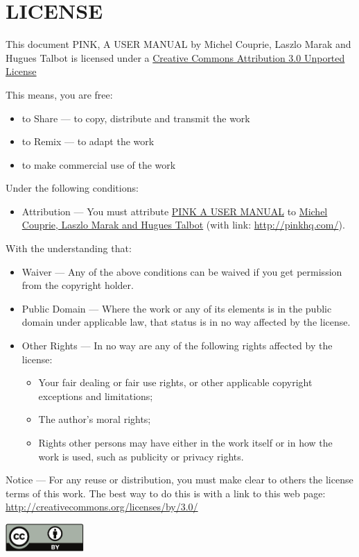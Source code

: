 \chapter*{LICENSE}

This document \og PINK, A USER MANUAL \fg by Michel Couprie, Laszlo Marak and Hugues Talbot is licensed under a \href{http://creativecommons.org/licenses/by/3.0/}{Creative Commons Attribution 3.0 Unported License}

This means, you are free:

\begin{itemize}
\item to Share — to copy, distribute and transmit the work
\item to Remix — to adapt the work
\item to make commercial use of the work
\end{itemize}

Under the following conditions:

\begin{itemize}
\item Attribution — You must attribute \href{http://creativecommons.org/choose/results-one?q_1=2&q_1=1&field_commercial=y&field_derivatives=y&field_jurisdiction=&field_format=Text&field_worktitle=PINK+A+USER+MANUAL&field_attribute_to_name=Hugues+Talbot&field_attribute_to_url=http%3A%2F%2Fpinkhq.com%2F&field_sourceurl=&field_morepermissionsurl=&lang=en_US&n_questions=3}{PINK A USER MANUAL} to \href{http://pinkhq.com}{Michel Couprie, Laszlo Marak and Hugues Talbot} (with link: \url{http://pinkhq.com/}).
\end{itemize}
  
With the understanding that:

\begin{itemize}
\item Waiver — Any of the above conditions can be waived if you get permission from the copyright holder.
\item Public Domain — Where the work or any of its elements is in the public domain under applicable law, that status is in no way affected by the license.
\item Other Rights — In no way are any of the following rights affected by the license:
  \begin{itemize}
  \item Your fair dealing or fair use rights, or other applicable copyright exceptions and limitations;
  \item The author's moral rights;
  \item Rights other persons may have either in the work itself or in how the work is used, such as publicity or privacy rights.
  \end{itemize}
\end{itemize}

Notice — For any reuse or distribution, you must make clear to others the license terms of this work. The best way to do this is with a link to this web page: \url{http://creativecommons.org/licenses/by/3.0/}

\vfill

\centerline{\hfill\includegraphics[width=3cm]{drawings/by.pdf}}
